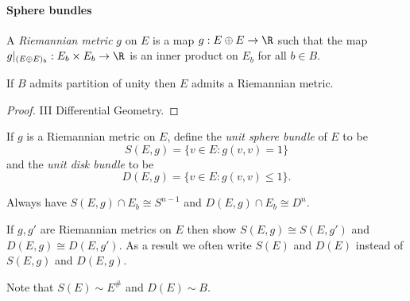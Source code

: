 \documentclass[a4paper]{article}
\begin{document}
\paragraph{Sphere bundles}

\begin{definition}
  A \emph{Riemannian metric} \(g\) on \(E\) is a map \(g: E \oplus E \to \R\) such that the map \(g|_{(E \oplus E)_b}: E_b \times E_b \to \R\) is an inner product on \(E_b\) for all \(b \in B\).
\end{definition}

\begin{lemma}
  If \(B\) admits partition of unity then \(E\) admits a Riemannian metric.
\end{lemma}

\begin{proof}
  III Differential Geometry.
\end{proof}

\begin{definition}
  If \(g\) is a Riemannian metric on \(E\), define the \emph{unit sphere bundle} of \(E\) to be
  \[
    S(E, g) = \{v \in E: g(v, v) = 1\}
  \]
  and the \emph{unit disk bundle} to be
  \[
    D(E, g) = \{v \in E: g(v, v) \leq 1\}.
  \]
\end{definition}

Always have \(S(E, g) \cap E_b \cong S^{n - 1}\) and \(D(E, g) \cap E_b \cong D^n\).

\begin{ex}
  If \(g, g'\) are Riemannian metrics on \(E\) then show \(S(E, g) \cong S(E, g')\) and \(D(E, g) \cong D(E, g')\). As a result we often write \(S(E)\) and \(D(E)\) instead of \(S(E, g)\) and \(D(E, g)\).
\end{ex}

Note that \(S(E) \sim E^\#\) and \(D(E) \sim B\).
\end{document}

